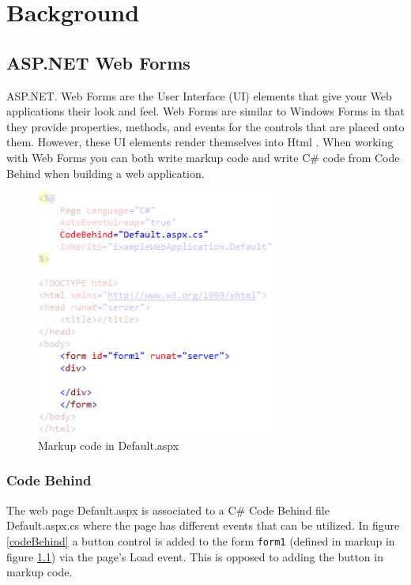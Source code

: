\chapter{Background}

\section{ASP.NET Web Forms} %
\label{sec:asp_net_web_forms}
	ASP.NET. Web Forms are the User Interface (UI) elements that give your Web applications their look and feel. Web Forms are similar to Windows Forms \cite{msdn01} in that they provide properties, methods, and events for the controls that are placed onto them. However, these UI elements render themselves into Html \cite{msdn02}. When working with Web Forms you can both write markup code and write C\# code from Code Behind when building a web application. 

	\begin{figure}[H]
					\includegraphics[width=8cm]{resources/images/Markup.png}
				\caption{Markup code in Default.aspx}
				\label{markup}
			\end{figure}

	\subsection{Code Behind} %
	\label{sub:code_behind}
		The web page Default.aspx is associated to a C\# Code Behind file Default.aspx.cs where the page has different events that can be utilized. In figure \ref{codeBehind} a button control is added to the form \texttt{form1} (defined in markup in figure \ref{markup}) via the page’s Load event. This is opposed to adding the button in markup code.


